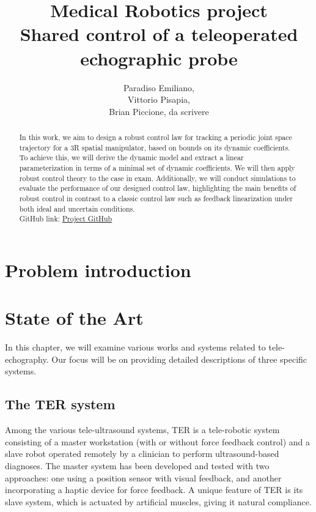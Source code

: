 \documentclass{article}
\author{Paradiso Emiliano,  \quad 1940454 \\Vittorio Pisapia,  \quad 1918590 \\Brian Piccione, \quad da scrivere}
\title{\Huge Medical Robotics project \\ \centering \Large \textbf{Shared control of a teleoperated echographic probe}}
\begin{document}
\maketitle
\vspace{2cm}

\begin{abstract}
\hspace*{-0.5cm}In this work, we aim to design a robust control law for tracking a periodic joint space trajectory for a 3R spatial manipulator, based on bounds on its dynamic coefficients. To achieve this, we will derive the dynamic model and extract a linear parameterization in terms of a minimal set of dynamic coefficients. We will then apply robust control theory to the case in exam. Additionally, we will conduct simulations to evaluate the performance of our designed control law, highlighting the main benefits of robust control in contrast to a classic control law such as feedback linearization under both ideal and uncertain conditions.
\\GitHub link: \uline{\href{https://github.com/VittorioPisapia/Medical-Robotics/tree/main}{Project GitHub}}
\end{abstract}

\newpage
\tableofcontents
\newpage

\section{Problem introduction}

\section{State of the Art}
In this chapter, we will examine various works and systems related to tele-echography. Our focus will be on providing detailed descriptions of three specific systems. 

\subsection{The TER system}
Among the various tele-ultrasound systems, TER is a tele-robotic system consisting of a master workstation (with or without force feedback control) and a slave robot operated remotely by a clinician to perform ultrasound-based diagnoses. The master system has been developed and tested with two approaches: one using a position sensor with visual feedback, and another incorporating a haptic device for force feedback. A unique feature of TER is its slave system, which is actuated by artificial muscles, giving it natural compliance.
\end{document}

